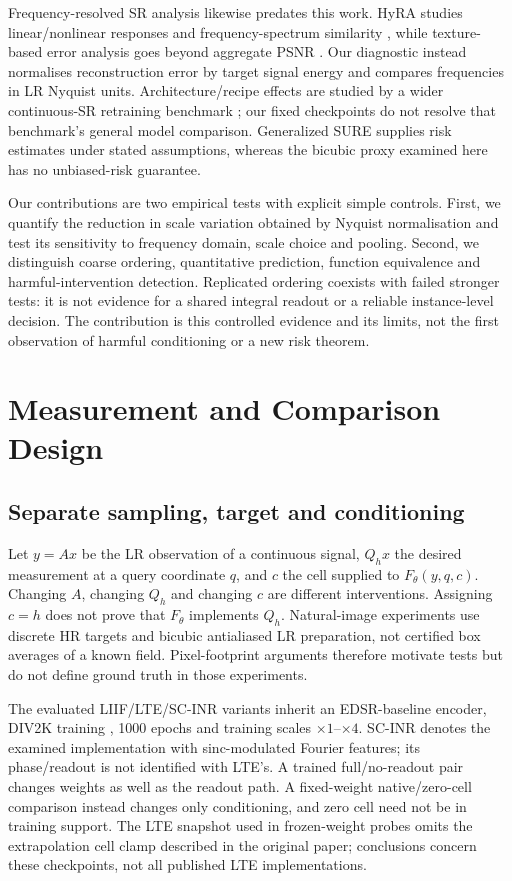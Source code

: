 Frequency-resolved SR analysis likewise predates this work. HyRA studies
linear/nonlinear responses and frequency-spectrum similarity
\cite{fsds2024}, while texture-based error analysis goes beyond aggregate
PSNR \cite{magid2022texture}. Our diagnostic instead normalises
reconstruction error by target signal energy and compares frequencies
in LR Nyquist units. Architecture/recipe effects are studied by a wider
continuous-SR retraining benchmark \cite{nasir2026empirical}; our fixed
checkpoints do not resolve that benchmark's general model comparison.
Generalized SURE \cite{eldar2008gsure} supplies risk estimates under stated
assumptions, whereas the bicubic proxy examined here has no unbiased-risk
guarantee.

Our contributions are two empirical tests with explicit simple controls.
First, we quantify the reduction in scale variation obtained by Nyquist
normalisation and test its sensitivity to frequency domain, scale choice
and pooling. Second, we distinguish coarse ordering, quantitative
prediction, function equivalence and harmful-intervention detection.
Replicated ordering coexists with failed stronger tests: it is not
evidence for a shared integral readout or a reliable instance-level
decision. The contribution is this controlled evidence and its limits,
not the first observation of harmful conditioning or a new risk theorem.

\section{Measurement and Comparison Design}
\label{sec:method}
\subsection{Separate sampling, target and conditioning}
Let $y=Ax$ be the LR observation of a continuous signal, $Q_hx$ the desired
measurement at a query coordinate $q$, and $c$ the cell supplied to
$F_\theta(y,q,c)$. Changing $A$, changing $Q_h$ and changing $c$ are
different interventions. Assigning $c=h$ does not prove that $F_\theta$
implements $Q_h$. Natural-image experiments use discrete HR targets and
bicubic antialiased LR preparation, not certified box averages of a known
field. Pixel-footprint arguments therefore motivate tests but do not
define ground truth in those experiments.

The evaluated LIIF/LTE/SC-INR variants inherit an EDSR-baseline encoder,
DIV2K training \cite{agustsson2017div2k}, 1000 epochs and training scales
$\times1$--$\times4$. SC-INR denotes the examined implementation with
sinc-modulated Fourier features; its phase/readout is not identified
with LTE's. A trained full/no-readout pair changes weights as well as
the readout path. A fixed-weight native/zero-cell comparison instead
changes only conditioning, and zero cell need not be in training support.
The LTE snapshot used in frozen-weight probes omits the extrapolation
cell clamp described in the original paper; conclusions concern these
checkpoints, not all published LTE implementations.


